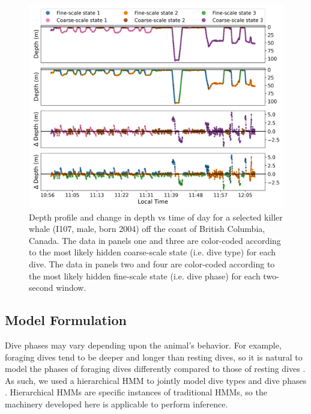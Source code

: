 \begin{figure}%
    \centering
    \includegraphics[width=5.5in]{../plt/decoded_dives_kw_I107_K_3_3_nWhales_8.png}
    \caption{Depth profile and change in depth vs time of day for a selected killer whale (I107, male, born 2004) off the coast of British Columbia, Canada. The data in panels one and three are color-coded according to the most likely hidden coarse-scale state (i.e. dive type) for each dive. The data in panels two and four are color-coded according to the most likely hidden fine-scale state (i.e. dive phase) for each two-second window.}
    \label{fig:data}
\end{figure}
%
\subsection{Model Formulation}

Dive phases may vary depending upon the animal's behavior. For example, foraging dives tend to be deeper and longer than resting dives, so it is natural to model the phases of foraging dives differently compared to those of resting dives \citep{Tennessen:2019b}. As such, we used a hierarchical HMM to jointly model dive types and dive phases \citep{Barajas:2017}. Hierarchical HMMs are specific instances of traditional HMMs, so the machinery developed here is applicable to perform inference. 

